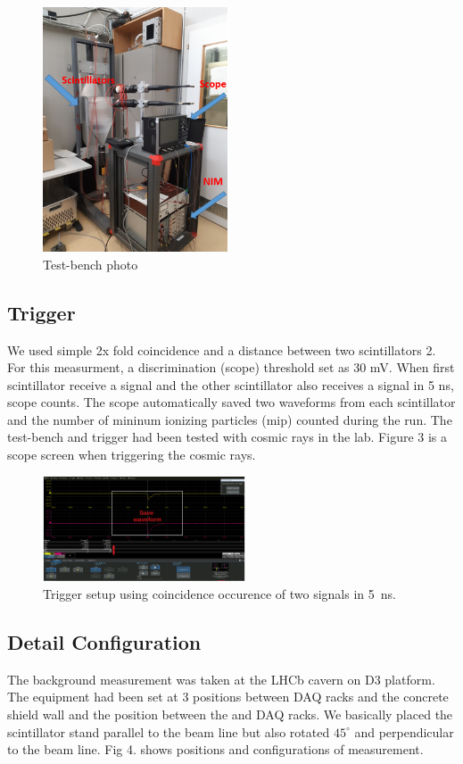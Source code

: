 \begin{figure}[h]
\centering
    \includegraphics[width=5.5cm]{figs/INT/Tools.png} 
\caption{ 
    Test-bench photo
}
\end{figure}

\subsection{Trigger}
We used simple 2x fold coincidence and a distance between two scintillators 2\cm. 
For this measurment, a discrimination (scope) threshold set as 30 mV.
When first scintillator receive a signal and the other scintillator also receives a signal in 5 ns, scope counts.
The scope automatically saved two waveforms from each scintillator and the number of mininum ionizing particles (mip) counted during the run.
The test-bench and trigger had been tested with cosmic rays in the lab.
Figure 3 is a scope screen when triggering the cosmic rays.

\begin{figure}[!h]
\centering
    \includegraphics[width=6cm]{figs/INT/waveform.pdf}
\caption{
    Trigger setup using coincidence occurence of two signals in 5~ns. 
}
\end{figure}

\subsection{Detail Configuration}

The background measurement was taken at the LHCb cavern on D3 platform. The equipment had been set at 3 positions between DAQ racks and the concrete shield wall and the position between the \delphi and DAQ racks.
We basically placed the scintillator stand parallel to the beam line but also rotated $45^{\circ}$ and perpendicular to the beam line.
Fig 4. shows positions and configurations of measurement.

